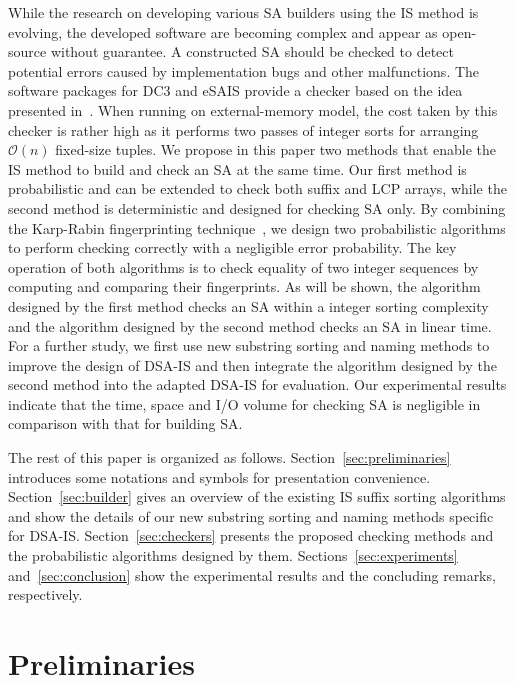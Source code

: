 \documentclass[10pt,journal,compsoc]{IEEEtran}
\begin{document}
While the research on developing various SA builders using the IS method is evolving, the developed software are becoming complex and appear as open-source without guarantee. 
A constructed SA should be checked to detect potential errors caused by implementation bugs and other malfunctions. 
The software packages for DC3 and eSAIS provide a checker based on the idea presented in~\cite{Dementiev2008a}. 
When running on external-memory model, the cost taken by this checker is rather high as it performs two passes of integer sorts for arranging $\mathcal{O}(n)$ fixed-size tuples. 
We propose in this paper two methods that enable the IS method to build and check an SA at the same time. 
Our first method is probabilistic and can be extended to check both suffix and LCP arrays, while the second method is deterministic and designed for checking SA only. 
By combining the Karp-Rabin fingerprinting technique~\cite{Karp1987}, we design two probabilistic algorithms to perform checking correctly with a negligible error probability. The key operation of both algorithms is to check equality of two integer sequences by computing and comparing their fingerprints. As will be shown, the algorithm designed by the first method checks an SA within a integer sorting complexity and the algorithm designed by the second method checks an SA in linear time. For a further study, we first use new substring sorting and naming methods to improve the design of DSA-IS and then integrate the algorithm designed by the second method into the adapted DSA-IS for evaluation. Our experimental results indicate that the time, space and I/O volume for checking SA is negligible in comparison with that for building SA.

The rest of this paper is organized as follows. Section~\ref{sec:preliminaries} introduces some notations and symbols for presentation convenience. Section~\ref{sec:builder} gives an overview of the existing IS suffix sorting algorithms and show the details of our new substring sorting and naming methods specific for DSA-IS. Section~\ref{sec:checkers} presents the proposed checking methods and the probabilistic algorithms designed by them. Sections~\ref{sec:experiments} and~\ref{sec:conclusion} show the experimental results and the concluding remarks, respectively.

\section{Preliminaries}~\label{sec:preliminaries}
\end{document}
